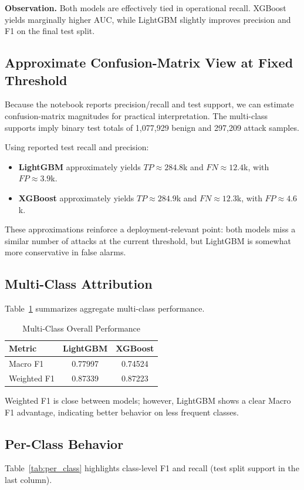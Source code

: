 \documentclass[10pt,journal]{IEEEtran}
\begin{document}
\textbf{Observation.} Both models are effectively tied in operational recall. XGBoost yields marginally higher AUC, while LightGBM slightly improves precision and F1 on the final test split.

\subsection{Approximate Confusion-Matrix View at Fixed Threshold}
Because the notebook reports precision/recall and test support, we can estimate confusion-matrix magnitudes for practical interpretation. The multi-class supports imply binary test totals of 1,077,929 benign and 297,209 attack samples.

Using reported test recall and precision:
\begin{itemize}
\item \textbf{LightGBM} approximately yields $TP\approx284.8$k and $FN\approx12.4$k, with $FP\approx3.9$k.
\item \textbf{XGBoost} approximately yields $TP\approx284.9$k and $FN\approx12.3$k, with $FP\approx4.6$k.
\end{itemize}

These approximations reinforce a deployment-relevant point: both models miss a similar number of attacks at the current threshold, but LightGBM is somewhat more conservative in false alarms.

\subsection{Multi-Class Attribution}
Table~\ref{tab:multi_overall} summarizes aggregate multi-class performance.

\begin{table}[!t]
\caption{Multi-Class Overall Performance}
\label{tab:multi_overall}
\centering
\begin{tabular}{l cc}
\toprule
Metric & LightGBM & XGBoost \\
\midrule
Macro F1 & 0.77997 & 0.74524 \\
Weighted F1 & 0.87339 & 0.87223 \\
\bottomrule
\end{tabular}
\end{table}

Weighted F1 is close between models; however, LightGBM shows a clear Macro F1 advantage, indicating better behavior on less frequent classes.

\subsection{Per-Class Behavior}
Table~\ref{tab:per_class} highlights class-level F1 and recall (test split support in the last column).
\end{document}

